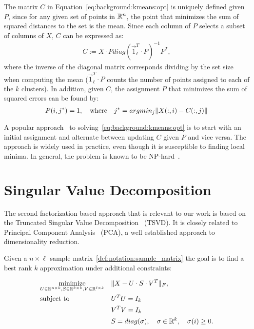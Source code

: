 The matrix $C$ in Equation~\ref{eq:background:kmeans:opt} is uniquely defined given $P$, since for any given set
of points in $\mathbb{R}^n$, the point that minimizes the sum of squared distances to the set is the mean. Since each
column of $P$ selects a subset of columns of $X$, $C$ can be expressed as:
\begin{equation}\label{eq:background:kmeans:centroids}
\begin{aligned}
 C := X\cdot P diag(\vec{1}_\ell^T \cdot P)^{-1} P^T,
\end{aligned}
\end{equation}
where the inverse of the diagonal matrix corresponds dividing by the set size when computing the mean ($\vec{1}_\ell^T \cdot P$ counts
the number of points assigned to each of the $k$ clusters). In addition, given $C$, the assignment $P$ that
minimizes the sum of squared errors can be found by:
\begin{equation}\label{eq:background:kmeans:assignments}
\begin{aligned}
P(i, j^*) = 1,\quad \textnormal{where}\quad j^* = argmin_j \lVert X(:,i) - C(:,j)\rVert
\end{aligned}
\end{equation}

A popular approach~\cite{kmeans} to solving~\ref{eq:background:kmeans:opt} is to start with an initial assignment and alternate between updating $C$ given $P$ and vice
versa. The approach is widely used in practice, even though it is susceptible to finding local minima. In general, the problem is known to be NP-hard~\cite{aloise2009np}.

\section{Singular Value Decomposition}\label{chap:background:svd}

The second factorization based approach that is relevant to our work is based on the Truncated Singular Value Decomposition~\cite{golub} (TSVD). It is closely
related to Principal Component Analysis~\cite{Pearson1901On} (PCA), a well established approach to dimensionality reduction.

Given a $n \times \ell$ sample matrix~\ref{def:notation:sample_matrix}
the goal is to find a best rank $k$ approximation under additional constraints:

\begin{equation}\label{eq:background:svd:opt}
\begin{aligned}
& \underset{U \in \mathbb{R}^{n \times k}, S \in \mathbb{R}^{k \times k}, V \in \mathbb{R}^{\ell \times k}}{\text{minimize}}
& & \lVert X - U \cdot S \cdot V^T\rVert_F, \\
& \text{subject to}
& & U^TU = I_k \\
& & & V^TV = I_k \\
& & & S = diag(\sigma), \quad \sigma \in \mathbb{R}^k, \quad \sigma(i) \geq 0.
\end{aligned}
\end{equation}

